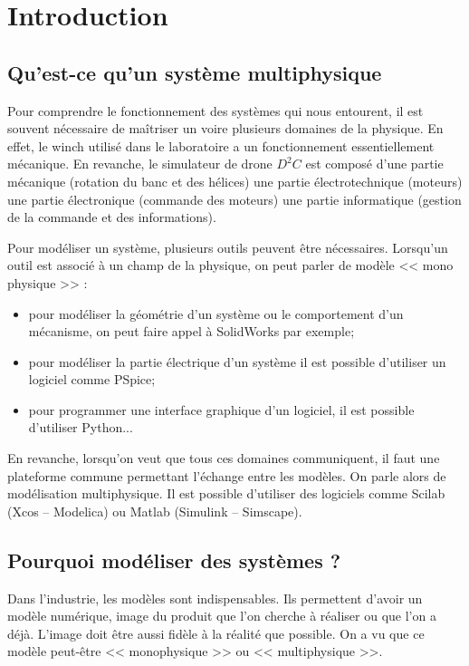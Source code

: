 \documentclass[10pt,fleqn]{article} %
\begin{document}

\setlength{\columnseprule}{.1pt}

\vspace{2cm}
\pagestyle{fancy}
\thispagestyle{plain}
\section{Introduction}
\subsection{Qu'est-ce qu'un système multiphysique}

Pour comprendre le fonctionnement des systèmes qui nous entourent, il est souvent nécessaire de maîtriser un voire plusieurs domaines de la physique. En effet, le winch utilisé dans le laboratoire a un fonctionnement essentiellement mécanique. En revanche, le simulateur de drone $D^2C$ est composé d'une partie mécanique (rotation du banc et des hélices) une partie électrotechnique (moteurs) une partie électronique (commande des moteurs) une partie informatique (gestion de la commande et des informations). 

Pour modéliser un système, plusieurs outils peuvent être nécessaires. Lorsqu'un outil est associé à un champ de la physique, on peut parler de modèle << mono physique >> :
\begin{itemize}
\item pour modéliser la géométrie d'un système ou le comportement d'un mécanisme, on peut faire appel à SolidWorks par exemple;
\item pour modéliser la partie électrique d'un système il est possible d'utiliser un logiciel comme PSpice;
\item pour programmer une interface graphique d'un logiciel, il est possible d'utiliser Python...
\end{itemize}

En revanche, lorsqu'on veut que tous ces domaines communiquent, il faut une plateforme commune permettant l'échange entre les modèles. On parle alors de modélisation multiphysique. Il est possible d'utiliser des logiciels comme Scilab (Xcos -- Modelica) ou Matlab (Simulink -- Simscape). 



\subsection{Pourquoi modéliser des systèmes ?}
Dans l'industrie, les modèles sont indispensables. Ils permettent d'avoir un modèle numérique, image du produit que l'on cherche à réaliser ou que l'on a déjà. L'image doit être aussi fidèle à la réalité que possible. On a vu que ce modèle peut-être << monophysique >> ou << multiphysique >>. 
\end{document}
